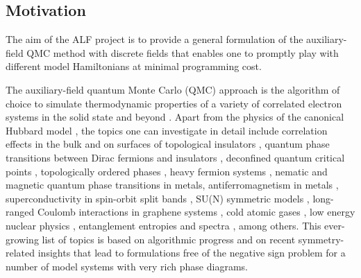 



\subsection{Motivation}

The aim of the ALF project is to provide a general formulation of the auxiliary-field QMC method with discrete  fields that enables one to promptly play with different model Hamiltonians  at  minimal programming cost.

The auxiliary-field quantum Monte Carlo (QMC) approach is the algorithm of choice to simulate  thermodynamic properties of a variety of correlated electron systems in the solid state and beyond \cite{Blankenbecler81,White89,Sugiyama86,Sorella89, Duane87, Assaad08_rev}.  
Apart from the physics of the  canonical Hubbard model 
\cite{Scalapino07,LeBlanc15},   the topics one can investigate in detail include correlation effects in the bulk and on surfaces of topological insulators \cite{Hohenadler10,Zheng11}, quantum phase transitions between  Dirac fermions  and insulators \cite{Assaad13,Toldin14,Otsuka16,Chandrasekharan13,Chandrasekharan15},  
deconfined quantum critical points \cite{Li15a,Assaad16}, topologically ordered phases \cite{Assaad16}, heavy fermion systems \cite{Assaad99a,Capponi00}, nematic \cite{Schattner15} and magnetic  \cite{Xu16c} quantum phase transitions in metals, antiferromagnetism in metals \cite{Berg12},    superconductivity in spin-orbit split bands \cite{Tang14_1}, SU(N) symmetric models \cite{Assaad04,Lang13},  long-ranged Coulomb interactions in graphene systems \cite{Hohenadler14,Tang15},  cold atomic gases  \cite{Rigol03},  low energy nuclear physics \cite{Lee09},  entanglement entropies and spectra \cite{Grover13,Broecker14,Assaad13a,Assaad15},  among others. 
This ever-growing list of topics is based on algorithmic progress and on recent symmetry-related insights  \cite{Wu04,Huffman14,Yao14a,Wei16} that lead to formulations free of the negative sign problem for a number of model systems with very rich phase diagrams.

